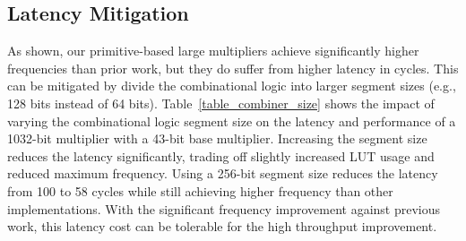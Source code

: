 \documentclass[conference]{IEEEtran}
\begin{document}

\subsection{Latency Mitigation}
As shown, our primitive-based large multipliers achieve significantly higher frequencies than prior work, but they do suffer from higher latency in cycles.
This can be mitigated by divide the combinational logic into larger segment sizes (e.g., 128 bits instead of 64 bits).
Table~\ref{table_combiner_size} shows the impact of varying the combinational logic segment size on the latency and performance of a 1032-bit multiplier with a 43-bit base multiplier.
Increasing the segment size reduces the latency significantly, trading off slightly increased LUT usage and reduced maximum frequency.
Using a 256-bit segment size reduces the latency from 100 to 58 cycles while still achieving higher frequency than other implementations.
With the significant frequency improvement against previous work, this latency cost can be tolerable for the high throughput improvement.



\begin{table}[t]
\centering
\caption{Impact of combinational logic segment size on latency and performance for 1032-bit multiplier 4-Karatsuba with 43-bit base}
\label{table_combiner_size}
\end{table}




\end{document}
